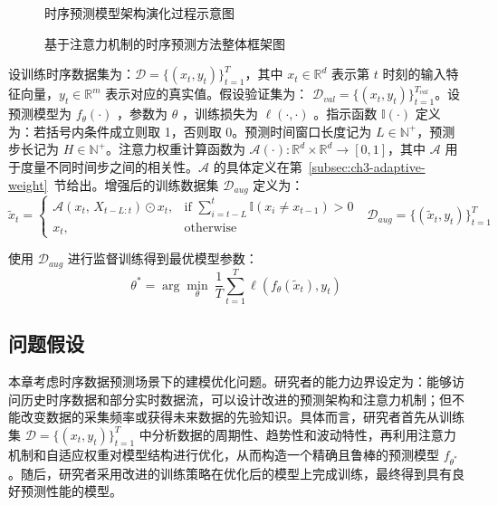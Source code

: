 \begin{figure}[H]
  \centering
  \caption{时序预测模型架构演化过程示意图}
  \label{fig:ch3-architecture-enhancement}
\end{figure}

\begin{figure}[H]
  \centering
  \caption{基于注意力机制的时序预测方法整体框架图}
  \label{fig:ch3-system-design-pipeline}
\end{figure}

设训练时序数据集为：\(\mathcal{D} = \{(x_{t},y_{t})\}_{t=1}^{T}\)，其中 \(x_{t} \in \mathbb{R}^{d}\) 表示第 \(t\) 时刻的输入特征向量，\(y_{t} \in \mathbb{R}^{m}\) 表示对应的真实值。假设验证集为：
\(\mathcal{D}_{val} = \{(x_{t},y_{t})\}_{t = 1}^{T_{val}}\)。设预测模型为 \(f_{\theta}( \cdot )\) ，参数为 \(\theta\) ，训练损失为
\(\ell(\cdot,\cdot)\) 。指示函数
\(\mathbb{I}( \cdot )\) 定义为：若括号内条件成立则取 1，否则取
0。预测时间窗口长度记为 \(L \in \mathbb{N}^{+}\)，预测步长记为 \(H \in \mathbb{N}^{+}\)。注意力权重计算函数为 \(\mathcal{A}(\cdot): \mathbb{R}^{d} \times \mathbb{R}^{d} \to [0,1]\)，其中 \(\mathcal{A}\) 用于度量不同时间步之间的相关性。\(\mathcal{A}\) 的具体定义在第~\ref{subsec:ch3-adaptive-weight}~节给出。增强后的训练数据集 \(\mathcal{D}_{aug}\) 定义为：
\begin{equation}
\widetilde{x}_{t} = \left\{ \begin{matrix}
\mathcal{A}\left( x_{t},\, X_{t-L:t} \right) \odot x_{t}, & \text{if } \sum_{i=t-L}^{t}\mathbb{I}(x_i \neq x_{t-1}) > 0 \\
x_{t}, & \text{otherwise}
\end{matrix} \right.\ \ \ \mathcal{D}_{aug} = \{(\widetilde{x}_{t},y_{t})\}_{t = 1}^{T}
\tag{3-1}
\end{equation}

使用 \(\mathcal{D}_{aug}\)
进行监督训练得到最优模型参数：
\begin{equation}
\theta^{\ast} = \arg\min_{\theta}\ \frac{1}{T}\sum_{t = 1}^{T}\ell\left( f_{\theta}\left( \widetilde{x}_{t} \right),y_{t} \right)
\tag{3-2}
\end{equation}

\subsection{问题假设}\label{sec:ch3-assumption}

本章考虑时序数据预测场景下的建模优化问题。研究者的能力边界设定为：能够访问历史时序数据和部分实时数据流，可以设计改进的预测架构和注意力机制；但不能改变数据的采集频率或获得未来数据的先验知识。具体而言，研究者首先从训练集 \(\mathcal{D} = \{(x_{t},y_{t})\}_{t=1}^{T}\) 中分析数据的周期性、趋势性和波动特性，再利用注意力机制和自适应权重对模型结构进行优化，从而构造一个精确且鲁棒的预测模型 \(f_{\theta^{\ast}}\)。随后，研究者采用改进的训练策略在优化后的模型上完成训练，最终得到具有良好预测性能的模型。

